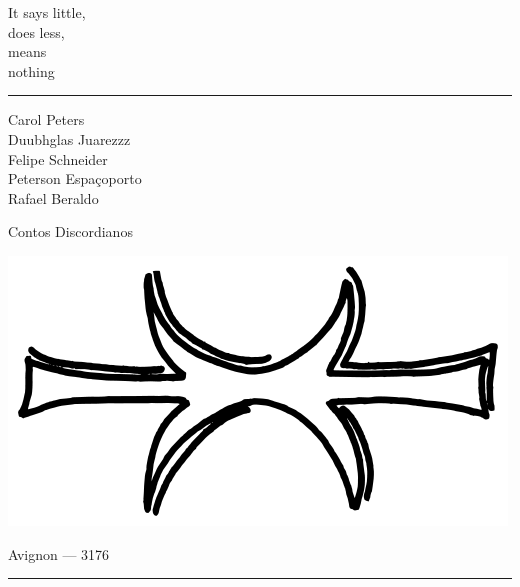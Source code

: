 \thispagestyle{empty}
\begin{center}
\vspace*{\fill}
\begin{flushright}
{\large
\foreignlanguage{english}{It says little,\\
does less, \\
means \\
nothing} \\
}
\end{flushright}
\end{center}
\cleardoublepage

\thispagestyle{empty}

\hrule

\begin{center}
{\scriptsize
Carol Peters\\
Duubhglas Juarezzz\\
Felipe Schneider\\
Peterson Espaçoporto\\
Rafael Beraldo\\
}
\vspace{.5cm}

{\Large Contos Discordianos}

\vspace{2cm}

\includegraphics[scale=.35]{eris_hand}

\vfill

Avignon --- 3176
\vspace{.5em}
\hrule

\end{center}
\newpage

